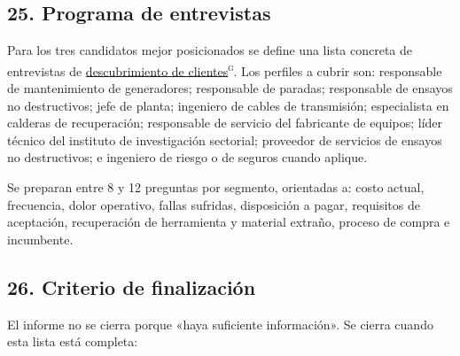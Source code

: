 \documentclass[11pt,a4paper]{article}
\begin{document}
\subsection*{25. Programa de entrevistas}

Para los tres candidatos mejor posicionados se define una lista concreta de entrevistas de \hyperlink{g-customer-discovery}{descubrimiento de clientes}\textsuperscript{\textsc{g}}. Los perfiles a cubrir son: responsable de mantenimiento de generadores; responsable de paradas; responsable de ensayos no destructivos; jefe de planta; ingeniero de cables de transmisión; especialista en calderas de recuperación; responsable de servicio del fabricante de equipos; líder técnico del instituto de investigación sectorial; proveedor de servicios de ensayos no destructivos; e ingeniero de riesgo o de seguros cuando aplique.

Se preparan entre 8 y 12 preguntas por segmento, orientadas a: costo actual, frecuencia, dolor operativo, fallas sufridas, disposición a pagar, requisitos de aceptación, recuperación de herramienta y material extraño, proceso de compra e incumbente.


\subsection*{26. Criterio de finalización}

El informe no se cierra porque «haya suficiente información». Se cierra cuando esta lista está completa:
\end{document}

